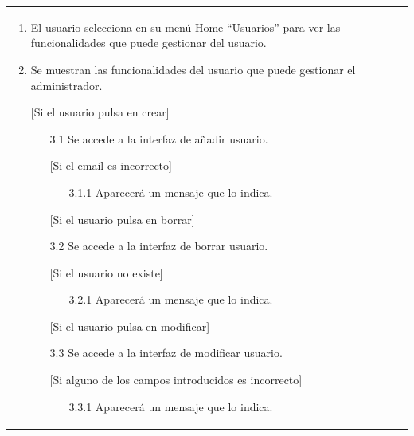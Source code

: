 \documentclass{report}
\begin{document}
\begin{center}
\begin{longtable}{|p{\linewidth}|}
\begin{enumerate}
                            \item El usuario selecciona en su menú Home “Usuarios” para ver las funcionalidades que puede gestionar del usuario.
                            \item Se muestran las funcionalidades del usuario que puede gestionar el administrador.
                            \item[] [Si el usuario pulsa en crear]
                                \begin{enumerate}
                                    \item[3.1] Se accede a la interfaz de añadir usuario.
                                    \item[] [Si el email es incorrecto]
                                    \begin{enumerate}
                                        \item[3.1.1] Aparecerá un mensaje que lo indica.
                                    \end{enumerate}
                                    \item[] [Si el usuario pulsa en borrar]
                                    \item[3.2] Se accede a la interfaz de borrar usuario.
                                    \item[] [Si el usuario no existe]
                                    \begin{enumerate}
                                        \item[3.2.1] Aparecerá un mensaje que lo indica.
                                    \end{enumerate}
                                    \item[] [Si el usuario pulsa en modificar]
                                    \item[3.3] Se accede a la interfaz de modificar usuario.
                                    \item[] [Si alguno de los campos introducidos es incorrecto]
                                    \begin{enumerate}
                                        \item[3.3.1] Aparecerá un mensaje que lo indica.
                                    \end{enumerate}
                                \end{enumerate}    
                        \end{enumerate}\\

\end{longtable}
\end{center}
\end{document}
